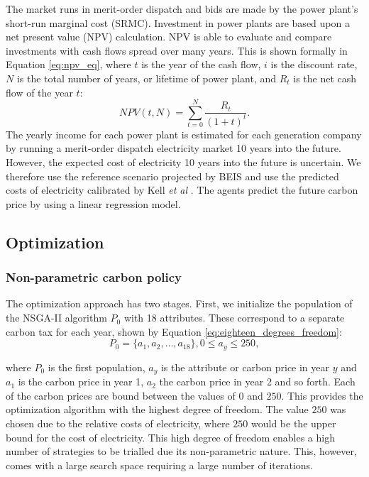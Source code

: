 \documentclass[sigconf]{acmart}
\begin{document}
The market runs in merit-order dispatch and bids are made by the power plant's short-run marginal cost (SRMC). Investment in power plants are based upon a net present value (NPV) calculation. NPV is able to evaluate and compare investments with cash flows spread over many years. This is shown formally in Equation \ref{eq:npv_eq}, where $t$ is the year of the cash flow, $i$ is the discount rate, $N$ is the total number of years, or lifetime of power plant, and $R_t$ is the net cash flow of the year $t$:
\begin{equation} \label{eq:npv_eq}
NPV(t, N) = \sum_{t=0}^{N}\frac{R_t}{(1+t)^t}.
\end{equation}
The yearly income for each power plant is estimated for each generation company by running a merit-order dispatch electricity market 10 years into the future. However, the expected cost of electricity 10 years into the future is uncertain. We therefore use the reference scenario projected by BEIS and use the predicted costs of electricity calibrated by Kell \textit{et al} \cite{DBEIS2019, Kell2020}. The agents predict the future carbon price by using a linear regression model.


\subsection{Optimization}
\label{ssec:optimization}
\subsubsection{Non-parametric carbon policy}
\label{sssec:non_parametric_strategy}
The optimization approach has two stages. First, we initialize the population of the NSGA-II algorithm $P_0$ with 18 attributes. These correspond to a separate carbon tax for each year, shown by Equation \ref{eq:eighteen_degrees_freedom}:
\begin{equation}
\label{eq:eighteen_degrees_freedom}
	P_0=\{a_1,a_2,\ldots,a_{18}\}, 0\leq a_y\leq 250,
\end{equation} 

\noindent where $P_0$ is the first population, $a_y$ is the attribute or carbon price in year $y$ and $a_1$ is the carbon price in year 1, $a_2$ the carbon price in year 2 and so forth. Each of the carbon prices are bound between the values of \textsterling$0$ and \textsterling$250$. This provides the optimization algorithm with the highest degree of freedom. The value \textsterling$250$ was chosen due to the relative costs of electricity, where \textsterling$250$ would be the upper bound for the cost of electricity. This high degree of freedom enables a high number of strategies to be trialled due its non-parametric nature. This, however, comes with a large search space requiring a large number of iterations.
\end{document}

